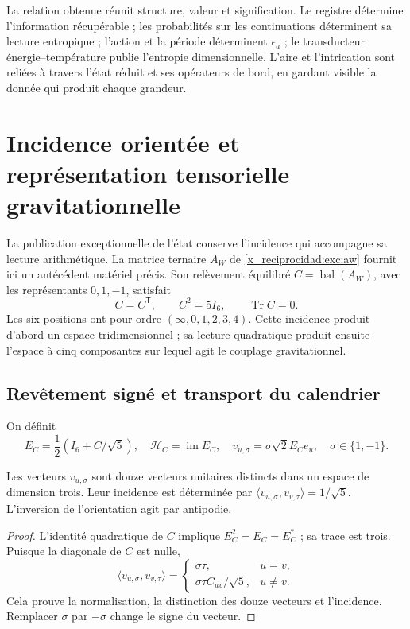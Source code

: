 La relation obtenue réunit structure, valeur et signification. Le registre
détermine l'information récupérable ; les probabilités sur les
continuations déterminent sa lecture entropique ; l'action et la période
déterminent \(\epsilon_a\) ; le transducteur énergie--température
publie l'entropie dimensionnelle. L'aire et l'intrication sont
reliées à travers l'état réduit et ses opérateurs de bord,
en gardant visible la donnée qui produit chaque grandeur.



\chapter{Incidence orientée et représentation tensorielle gravitationnelle}
\label{x_reciprocidad:vii:sec:pentacomponente}
La publication exceptionnelle de l'état conserve l'incidence qui accompagne
sa lecture arithmétique. La matrice ternaire \(A_W\) de
\eqref{x_reciprocidad:exc:aw} fournit ici un antécédent matériel précis. Son
relèvement équilibré \(C=\operatorname{bal}(A_W)\), avec les représentants
\(0,1,-1\), satisfait
\[
 C=C^{\mathsf T},\qquad C^2=5I_6,\qquad \operatorname{Tr}C=0.
\]
Les six positions ont pour ordre \((\infty,0,1,2,3,4)\). Cette incidence produit d'abord un espace tridimensionnel ; sa lecture quadratique produit ensuite l'espace à cinq composantes sur lequel agit le couplage gravitationnel.

\section{Revêtement signé et transport du calendrier}
On définit
\[
 E_C=\frac12(I_6+C/\sqrt5),\quad
 \mathcal H_C=\operatorname{im}E_C,\quad
 v_{u,\sigma}=\sigma\sqrt2E_Ce_u,\quad \sigma\in\{1,-1\}.
\]
\begin{proposition}
\label{x_reciprocidad:vii:prop:doce-orientadas}
Les vecteurs \(v_{u,\sigma}\) sont douze vecteurs unitaires distincts
dans un espace de dimension trois. Leur incidence est déterminée par
\(\langle v_{u,\sigma},v_{v,\tau}\rangle=1/\sqrt5\).
L'inversion de l'orientation agit par antipodie.
\end{proposition}
\begin{proof}
L'identité quadratique de \(C\) implique \(E_C^2=E_C=E_C^*\) ; sa trace est trois. Puisque la diagonale de \(C\) est nulle,
\[
 \langle v_{u,\sigma},v_{v,\tau}\rangle
 =\begin{cases}\sigma\tau,&u=v,\\
 \sigma\tau C_{uv}/\sqrt5,&u\ne v.
 \end{cases}
\]
Cela prouve la normalisation, la distinction des douze vecteurs et l'incidence.
Remplacer \(\sigma\) par \(-\sigma\) change le signe du vecteur.
\end{proof}

